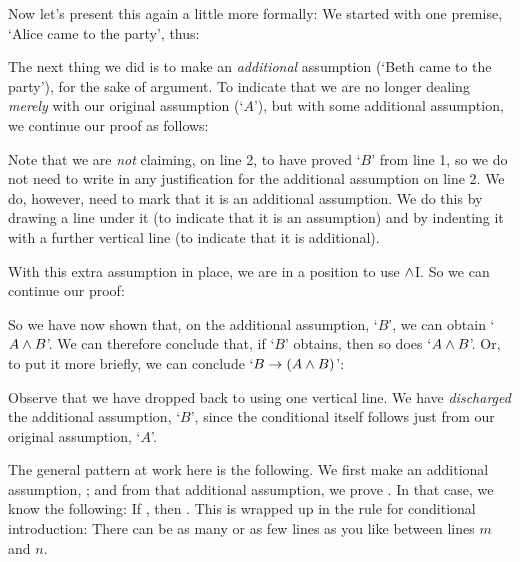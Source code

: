 Now let's present this again a little more formally: We started with one premise, `Alice came to the party', thus:
	\begin{fitchproof}
	\end{fitchproof}
The next thing we did is to make an \emph{additional} assumption (`Beth came to the party'), for the sake of argument. To indicate that we are no longer dealing \emph{merely} with our original assumption (`$A$'), but with some additional assumption, we continue our proof as follows:
	\begin{fitchproof}
	\hypo{r}{A}
		\open
			\hypo{l}{B}
	\end{fitchproof}
Note that we are \emph{not} claiming, on line 2, to have proved `$B$' from line 1, so we do not need to write in any justification for the additional assumption on line 2. We do, however, need to mark that it is an additional assumption. We do this by drawing a line under it (to indicate that it is an assumption) and by indenting it with a further vertical line (to indicate that it is additional).

With this extra assumption in place, we are in a position to use $\mathbin{\wedge}$I. So we can continue our proof:
	\begin{fitchproof}
		\open
			\andI{r, l}
	\end{fitchproof}
So we have now shown that, on the additional assumption, `$B$', we can obtain `$A \mathbin{\wedge} B$'. We can therefore conclude that, if `$B$' obtains, then so does `$A \mathbin{\wedge} B$'. Or, to put it more briefly, we can conclude `$B \rightarrow (A \mathbin{\wedge} B)$':
	\begin{fitchproof}
		\hypo{r}{A}
		\open
			\hypo{l}{B}
			\andI{r, l}
			\close
		\ifI{l-rl}
	\end{fitchproof}
Observe that we have dropped back to using one vertical line.  We have \emph{discharged} the additional assumption, `$B$', since the conditional itself follows just from our original assumption, `$A$'.

The general pattern at work here is the following. We first make an additional assumption, \metaX; and from that additional assumption, we prove \metaY. In that case, we know the following: If \metaX, then \metaY. This is wrapped up in the rule for conditional introduction:
\factoidbox{
	\begin{fitchproof}
	\open
		\hypo[m]{a}{\metaX}
		\ellipsesline
		\have[n]{b}{\metaY}
	\close
	\have[\ ]{ab}{\metaX\eif\metaY}\ifI{a-b}
	\end{fitchproof}}
There can be as many or as few lines as you like between lines $m$ and $n$.

